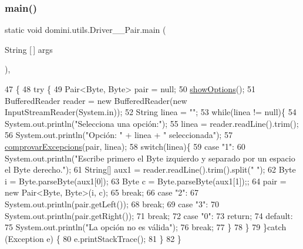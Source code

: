 \subsubsection{\texorpdfstring{main()}{main()}}
{\footnotesize\ttfamily static void domini.\+utils.\+Driver\+\_\+\+\_\+\+Pair.\+main (\begin{DoxyParamCaption}\item[{String \mbox{[}$\,$\mbox{]}}]{args }\end{DoxyParamCaption})\hspace{0.3cm}{\ttfamily [inline]}, {\ttfamily [static]}}


\begin{DoxyCode}
47                                            \{
48     \textcolor{keywordflow}{try} \{
49         Pair<Byte, Byte> pair = null;
50         \hyperlink{classdomini_1_1utils_1_1Driver____Pair_a97596378f21ba4ab9c0c4ccb4041425b}{showOptions}();
51         BufferedReader reader = \textcolor{keyword}{new} BufferedReader(\textcolor{keyword}{new} InputStreamReader(System.in));
52         String linea = \textcolor{stringliteral}{""};
53         \textcolor{keywordflow}{while}(linea != null)\{
54             System.out.println(\textcolor{stringliteral}{"Selecciona una opción:"});
55             linea = reader.readLine().trim();
56             System.out.println(\textcolor{stringliteral}{"Opción: "} + linea + \textcolor{stringliteral}{" seleccionada"});
57             \hyperlink{classdomini_1_1utils_1_1Driver____Pair_a640e07e7811e0b56a99ca1afb7e16b65}{comprovarExcepcions}(pair, linea);
58             \textcolor{keywordflow}{switch}(linea)\{
59                 \textcolor{keywordflow}{case} \textcolor{stringliteral}{"1"}:
60                     System.out.println(\textcolor{stringliteral}{"Escribe primero el Byte izquierdo y separado por un espacio el Byte
       derecho."});
61                     String[] aux1 = reader.readLine().trim().split(\textcolor{stringliteral}{" "});
62                     Byte i = Byte.parseByte(aux1[0]);
63                     Byte c = Byte.parseByte(aux1[1]);;
64                     pair = \textcolor{keyword}{new} Pair<Byte, Byte>(i, c);
65                 \textcolor{keywordflow}{break};
66                 \textcolor{keywordflow}{case} \textcolor{stringliteral}{"2"}:
67                     System.out.println(pair.getLeft());
68                 \textcolor{keywordflow}{break};
69                 \textcolor{keywordflow}{case} \textcolor{stringliteral}{"3"}:
70                 System.out.println(pair.getRight());
71                 \textcolor{keywordflow}{break};
72                 \textcolor{keywordflow}{case} \textcolor{stringliteral}{"0"}:
73                     \textcolor{keywordflow}{return};
74                 \textcolor{keywordflow}{default}:
75                     System.out.println(\textcolor{stringliteral}{"La opción no es válida"});
76                 \textcolor{keywordflow}{break};
77             \}
78         \}
79     \}\textcolor{keywordflow}{catch} (Exception e) \{
80         e.printStackTrace();
81     \}
82     \}
\end{DoxyCode}
